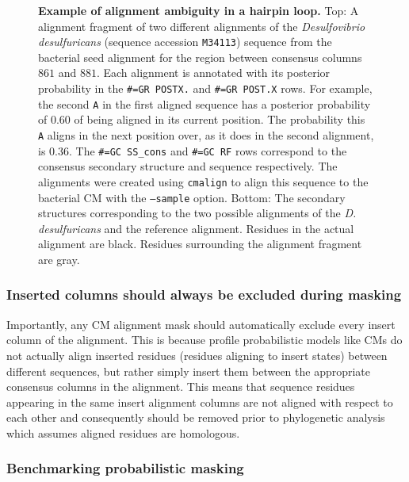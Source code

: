 \begin{figure}
\begin{center}
\caption[Example of alignment ambiguity in a hairpin loop.]{
  \textbf{Example of alignment ambiguity in a hairpin loop.}  Top: A
  alignment fragment of two different alignments of the
  \emph{Desulfovibrio desulfuricans} (sequence accession
  \texttt{M34113}) sequence from the  bacterial seed
  alignment for the region between consensus columns $861$ and $881$.
  Each alignment is annotated with its posterior probability in the
  \texttt{\#=GR POSTX.} and \texttt{\#=GR POST.X} rows.  For example,
  the second \texttt{A} in the first aligned sequence has a posterior
  probability of $0.60$ of being aligned in its current position. The
  probability this \texttt{A} aligns in the next position over, as it
  does in the second alignment, is $0.36$.  The \texttt{\#=GC
    SS\_cons} and \texttt{\#=GC RF} rows correspond to the consensus
  secondary structure and sequence respectively.  The alignments were
  created using \texttt{cmalign} to align this sequence to the
  bacterial CM with the \texttt{--sample} option.  Bottom: The
  secondary structures corresponding to the two possible alignments of
  the \emph{D. desulfuricans} and the reference alignment.  Residues
  in the actual alignment are black. Residues surrounding the
  alignment fragment are gray.}
\end{center}
\label{fig:ambiguity}
\end{figure}

\subsubsection{Inserted columns should always be excluded during masking}

Importantly, any CM alignment mask should automatically exclude 
every insert column of the alignment. This is because profile
probabilistic models like CMs do not actually align inserted residues
(residues aligning to insert states) between different sequences, but
rather simply insert them between the appropriate consensus columns in
the alignment. This means that sequence residues appearing in the same
insert alignment columns are not aligned with respect to each
other and consequently should be removed prior to phylogenetic
analysis which assumes aligned residues are homologous.

\subsubsection{Benchmarking probabilistic masking}

